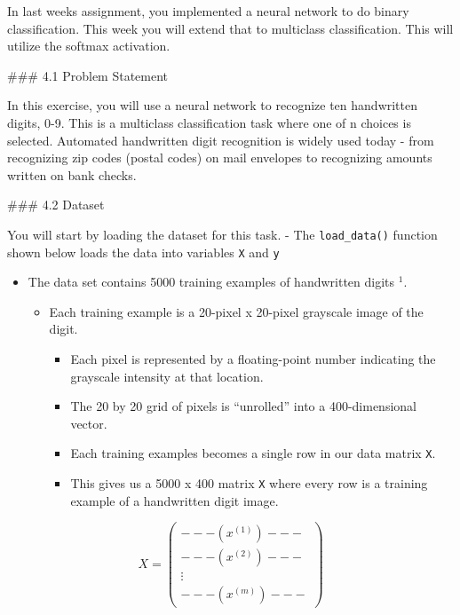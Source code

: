 \documentclass[11pt]{article}
\providecommand{\tightlist}{%
      \setlength{\itemsep}{0pt}\setlength{\parskip}{0pt}}
\begin{document}
In last weeks assignment, you implemented a neural network to do binary
classification. This week you will extend that to multiclass
classification. This will utilize the softmax activation.

\#\#\# 4.1 Problem Statement

In this exercise, you will use a neural network to recognize ten
handwritten digits, 0-9. This is a multiclass classification task where
one of n choices is selected. Automated handwritten digit recognition is
widely used today - from recognizing zip codes (postal codes) on mail
envelopes to recognizing amounts written on bank checks.

\#\#\# 4.2 Dataset

You will start by loading the dataset for this task. - The
\texttt{load\_data()} function shown below loads the data into variables
\texttt{X} and \texttt{y}

\begin{itemize}
\item
  The data set contains 5000 training examples of handwritten digits
  \(^1\).

  \begin{itemize}
  \tightlist
  \item
    Each training example is a 20-pixel x 20-pixel grayscale image of
    the digit.

    \begin{itemize}
    \tightlist
    \item
      Each pixel is represented by a floating-point number indicating
      the grayscale intensity at that location.
    \item
      The 20 by 20 grid of pixels is ``unrolled'' into a 400-dimensional
      vector.
    \item
      Each training examples becomes a single row in our data matrix
      \texttt{X}.
    \item
      This gives us a 5000 x 400 matrix \texttt{X} where every row is a
      training example of a handwritten digit image.
    \end{itemize}
  \end{itemize}
\end{itemize}

\[X = 
\left(\begin{array}{cc} 
--- (x^{(1)}) --- \\
--- (x^{(2)}) --- \\
\vdots \\ 
--- (x^{(m)}) --- 
\end{array}\right)\]
\end{document}
